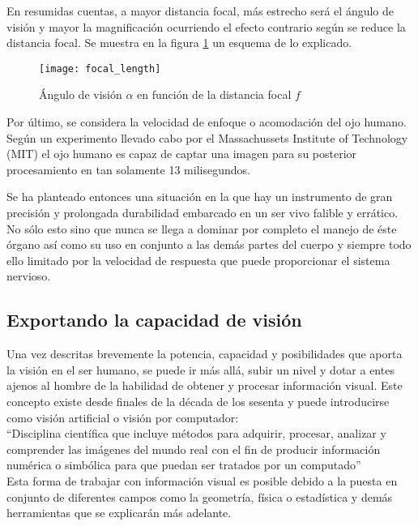 En resumidas cuentas, a mayor distancia focal, más estrecho será el ángulo de visión y mayor la magnificación ocurriendo el efecto contrario según se reduce la distancia focal. Se muestra en la figura \ref{fig:focal_length} un esquema de lo explicado. 


\begin{figure}[!htb]
\centering
{}
  \texttt{[image: focal\_length]}
  \caption{Ángulo de visión $\alpha$ en función de la distancia focal $f$}\label{fig:focal_length}
\endminipage\hfill

\end{figure}



Por último, se considera la velocidad de enfoque o acomodación del ojo humano. Según un experimento llevado cabo por el Massachussets Institute of Technology (MIT)\cite{mit_experiment} el ojo humano es capaz de captar una imagen para su posterior procesamiento en tan solamente 13 milisegundos.



Se ha planteado entonces una situación en la que hay un instrumento de gran precisión y prolongada durabilidad embarcado en un ser vivo falible y errático. No sólo esto sino que nunca se llega a dominar por completo el manejo de éste órgano así como su uso en conjunto a las demás partes del cuerpo y siempre todo ello limitado por la velocidad de respuesta que puede proporcionar el sistema nervioso.




\subsection{Exportando la capacidad de visión}

Una vez descritas brevemente la potencia, capacidad y posibilidades que aporta la visión en el ser humano, se puede ir más allá, subir un nivel y dotar a entes ajenos al hombre de la habilidad de obtener y procesar información visual. Este concepto existe desde finales de la década de los sesenta y puede introducirse como visión artificial o visión por computador\cite{vision_artificial}:
\\
``Disciplina científica que incluye métodos para adquirir, procesar, analizar y comprender las imágenes del mundo real con el fin de producir información numérica o simbólica para que puedan ser tratados por un computado''
\\
Esta forma de trabajar con información visual es posible debido a la puesta en conjunto de diferentes campos como la geometría, física o estadística y demás herramientas que se explicarán más adelante.

